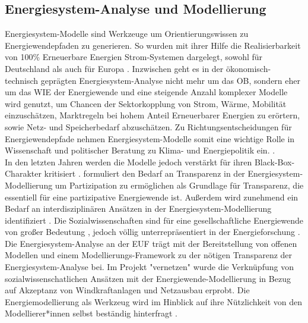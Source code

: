\documentclass[a4paper,11pt,twoside]{scrartcl}
\begin{document}
\subsection*{Energiesystem-Analyse und Modellierung}
Energiesystem-Modelle sind Werkzeuge um  Orientierungswissen zu Energiewendepfaden zu generieren. So wurden mit ihrer Hilfe die Realisierbarkeit von 100\% Erneuerbare Energien Strom-Systemen dargelegt, sowohl für Deutschland \cite{SRU2011} als auch für Europa \cite{Hohmeyer2015}. Inzwischen geht es in der ökonomisch-technisch geprägten Energiesystem-Analyse nicht mehr um das OB, sondern eher um das WIE der Energiewende und  eine steigende Anzahl komplexer Modelle wird genutzt, um Chancen der Sektorkopplung von Strom, Wärme, Mobilität \cite{Quaschning2016} einzuschätzen, Marktregeln bei hohem Anteil Erneuerbarer Energien zu erörtern, sowie Netz- \cite{openEgo2015} und Speicherbedarf \cite{ANGUS2017} abzuschätzen.
Zu Richtungsentscheidungen für Energiewendepfade nehmen Energiesystem-Modelle somit eine wichtige Rolle in Wissenschaft und politischer Beratung zu Klima- und Energiepolitik ein. \cite{Dieckhoff2015}.\\
In den letzten Jahren werden die Modelle jedoch verstärkt für ihren Black-Box-Charakter kritisiert \cite{Pfenninger2017, Pfenninger2017b,Cao2016}. \citep{Wiese2015} formuliert den Bedarf an Transparenz in der Energiesystem-Modellierung um Partizipation zu ermöglichen \cite{Wiese2014} als Grundlage für Transparenz, die essentiell für eine partizipative Energiewende ist.
Außerdem wird zunehmend ein Bedarf an interdisziplinären Ansätzen in der Energiesystem-Modellierung identifiziert \cite{Wiese2018,Pfenninger2014,Schuitema2017}. Die  Sozialwissenschaften sind für eine gesellschaftliche Energiewende von großer Bedeutung \cite{Sovacool2015}, jedoch völlig unterrepräsentiert in der Energieforschung \cite{Sovacool2014}.\\
Die Energiesystem-Analyse an der EUF trägt mit der Bereitstellung von offenen Modellen \cite{renpass,renpassGIS} und einem Modellierungs-Framework \cite{oemof} zu der nötigen Transparenz der Energiesystem-Analyse bei. Im Projekt "vernetzen" \cite{vernetzen2016} wurde die Verknüpfung von sozialwissenschatlichen Ansätzen mit der Energiewende-Modellierung in Bezug auf Akzeptanz von Windkraftanlagen und Netzausbau erprobt. Die Energiemodellierung als Werkzeug wird im Hinblick auf ihre Nützlichkeit von den Modellierer*innen selbst beständig hinterfragt \cite{Wiese2018}.  %
\end{document}
